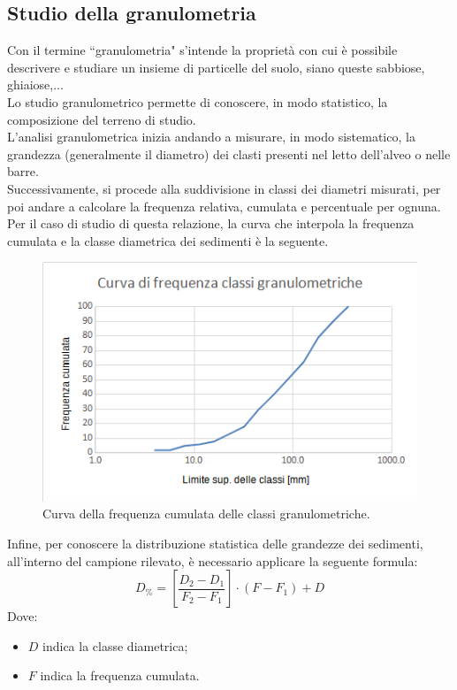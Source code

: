 \subsection{Studio della granulometria}
Con il termine ``granulometria" s'intende la proprietà con cui è possibile descrivere e studiare un insieme di particelle del suolo, siano queste sabbiose, ghiaiose,...\\
Lo studio granulometrico permette di conoscere, in modo statistico, la composizione del terreno di studio.\\
L'analisi granulometrica inizia andando a misurare, in modo sistematico, la grandezza (generalmente il diametro) dei clasti presenti nel letto dell'alveo o nelle barre.\\
Successivamente, si procede alla suddivisione in classi dei diametri misurati, per poi andare a calcolare la frequenza relativa, cumulata e percentuale per ognuna.\\
Per il caso di studio di questa relazione, la curva che interpola la frequenza cumulata e la classe diametrica dei sedimenti è la seguente.
\begin{figure}[H] \centering
    \includegraphics[scale=0.75]{immagini/curva_freq_classi_granuometriche.png}
    \caption{Curva della frequenza cumulata delle classi granulometriche.}
    \label{curva_freq_classi_granulometriche}
\end{figure}
Infine, per conoscere la distribuzione statistica delle grandezze dei  sedimenti, all'interno del campione rilevato, è necessario applicare la seguente formula:
\begin{equation}
D_\% = \left[\frac{D_2-D_1}{F_2-F_1}\right] \cdot (F-F_1)+D
\end{equation} 
Dove:
\begin{itemize}
    \item $D$ indica la classe diametrica;
    \item $F$ indica la frequenza cumulata.
\end{itemize}
